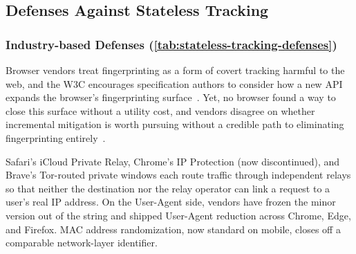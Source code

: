 \subsection{Defenses Against Stateless Tracking}
\label{sec:stateless-defenses}

% 


\subsubsection{Industry-based Defenses (\autoref{tab:stateless-tracking-defenses})}
\label{sec:stateless-defenses-industry}



Browser vendors treat fingerprinting as a form of covert tracking harmful to the web, and the W3C encourages specification authors to consider how a new API expands the browser's fingerprinting surface~\cite{nottinghamUnsanctionedWebTracking2015,dotyMitigatingBrowserFingerprinting2019}.
%
Yet, no browser found a way to close this surface without a utility cost, and vendors disagree on whether incremental mitigation is worth pursuing without a credible path to eliminating fingerprinting entirely~\cite{snyderBraveFingerprintingPrivacy2019,rescorlaTechnicalCommentsPrivacy2021}.


%
Safari's iCloud Private Relay, Chrome's IP Protection (now discontinued), and Brave's Tor-routed private windows each route traffic through independent relays so that neither the destination nor the relay operator can link a request to a user's real IP address.
%
On the User-Agent side, vendors have frozen the minor version out of the string and shipped User-Agent reduction across Chrome, Edge, and Firefox.
%
MAC address randomization, now standard on mobile, closes off a comparable network-layer identifier.



